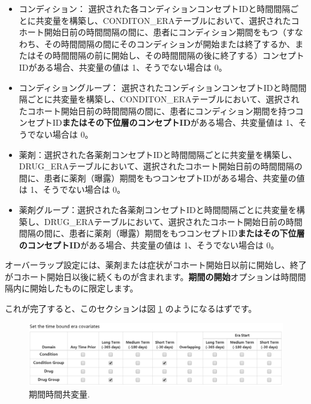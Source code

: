 \documentclass[
  11pt]{book}
\theoremstyle{definition}
\theoremstyle{definition}
\theoremstyle{definition}
\theoremstyle{definition}
\theoremstyle{remark}
\begin{document}
\begin{itemize}
\item
  コンディション： 選択された各コンディションコンセプトIDと時間間隔ごとに共変量を構築し、CONDITON\_ERAテーブルにおいて、選択されたコホート開始日前の時間間隔の間に、患者にコンディション期間をもつ（すなわち、その時間間隔の間にそのコンディションが開始または終了するか、またはその時間間隔の前に開始し、その時間間隔の後に終了する）コンセプトIDがある場合、共変量の値は 1、そうでない場合は 0。
\item
  コンディショングループ： 選択されたコンディションコンセプトIDと時間間隔ごとに共変量を構築し、CONDITON\_ERAテーブルにおいて、選択されたコホート開始日前の時間間隔の間に、患者にコンディション期間を持つコンセプトID\textbf{またはその下位層のコンセプトID}がある場合、共変量値は 1、そうでない場合は 0。
\item
  薬剤：選択された各薬剤コンセプトIDと時間間隔ごとに共変量を構築し、DRUG\_ERAテーブルにおいて、選択されたコホート開始日前の時間間隔の間に、患者に薬剤（曝露）期間をもつコンセプトIDがある場合、共変量の値は 1、そうでない場合は 0。
\item
  薬剤グループ：選択された各薬剤コンセプトIDと時間間隔ごとに共変量を構築し、DRUG\_ERAテーブルにおいて、選択されたコホート開始日前の時間間隔の間に、患者に薬剤（曝露）期間をもつコンセプトID\textbf{またはその下位層のコンセプトID}がある場合、共変量の値は 1、そうでない場合は 0。
\end{itemize}

オーバーラップ設定には、薬剤または症状がコホート開始日以前に開始し、終了がコホート開始日以後に続くものが含まれます。\textbf{期間の開始}オプションは時間間隔内に開始したものに限定します。

これが完了すると、このセクションは図 \ref{fig:covariateSettings4} のようになるはずです。

\begin{figure}

{\centering \includegraphics[width=1\linewidth]{images/PatientLevelPrediction/covariateSettings4} 

}

\caption{期間時間共変量.}\label{fig:covariateSettings4}
\end{figure}
\end{document}

